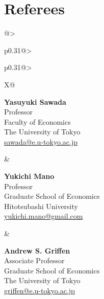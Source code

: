 \documentclass[10pt,a4paper]{article}
\begin{document}
\section*{Referees}
\begin{tabularx}{\textwidth}{@{}>{\raggedright\arraybackslash}p{0.31\textwidth}@{\hspace{0.02\textwidth}}>{\raggedright\arraybackslash}p{0.31\textwidth}@{\hspace{0.02\textwidth}}>{\raggedright\arraybackslash}X@{}}
\begin{minipage}[t]{\linewidth}
\textbf{Yasuyuki Sawada}\\
Professor\\
Faculty of Economics\\
The University of Tokyo\\
\href{mailto:sawada@e.u-tokyo.ac.jp}{sawada@e.u-tokyo.ac.jp}
\end{minipage}
&
\begin{minipage}[t]{\linewidth}
\textbf{Yukichi Mano}\\
Professor\\
Graduate School of Economics\\
Hitotsubashi University\\
\href{mailto:yukichi.mano@gmail.com}{yukichi.mano@gmail.com}
\end{minipage}
&
\begin{minipage}[t]{\linewidth}
\textbf{Andrew S. Griffen}\\
Associate Professor\\
Graduate School of Economics\\
The University of Tokyo\\
\href{mailto:griffen@e.u-tokyo.ac.jp}{griffen@e.u-tokyo.ac.jp}
\end{minipage}
\end{tabularx}
\end{document}
